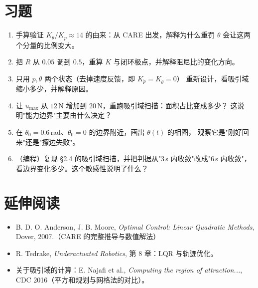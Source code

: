 \section*{习题}

\begin{enumerate}[leftmargin=2em,itemsep=6pt]
  \item 手算验证 $K_\theta/K_p\approx 14$ 的由来：从 CARE 出发，解释为什么重罚 $\theta$
        会让这两个分量的比例变大。
  \item 把 $R$ 从 $0.05$ 调到 $0.5$，重算 $K$ 与闭环极点，并解释阻尼比的变化方向。
  \item 只用 $p,\theta$ 两个状态（去掉速度反馈，即 $K_{\dot p}=K_{\dot\theta}=0$）
        重新设计，看吸引域缩小多少，并解释原因。
  \item 让 $u_{\max}$ 从 $12$\,N 增加到 $20$\,N，重跑吸引域扫描：面积占比变成多少？
        这说明"能力边界"主要由什么决定？
  \item 在 $\theta_0=0.6$\,rad、$\dot\theta_0=0$ 的边界附近，画出 $\theta(t)$ 的相图，
        观察它是"刚好回来"还是"擦边失败"。
  \item （编程）复现 \S2.4 的吸引域扫描，并把判据从"$3$\,s 内收敛"改成"$6$\,s 内收敛"，
        看边界变化多少。这个敏感性说明了什么？
\end{enumerate}

\section*{延伸阅读}
\begin{itemize}[leftmargin=2em,itemsep=2pt]
  \item B. D. O. Anderson, J. B. Moore, \emph{Optimal Control: Linear Quadratic Methods},
        Dover, 2007.（CARE 的完整推导与数值解法）
  \item R. Tedrake, \emph{Underactuated Robotics}, 第 8 章：LQR 与轨迹优化。
  \item 关于吸引域的计算：E. Najafi et al., \emph{Computing the region of attraction...},
        CDC 2016（平方和规划与网格法的对比）。
\end{itemize}
